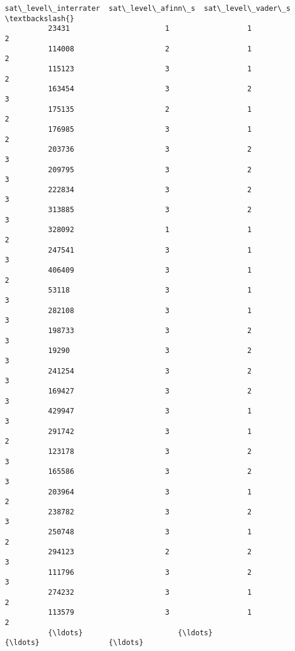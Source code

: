 \documentclass[11pt]{article}
\begin{document}
\begin{Verbatim}[commandchars=\\\{\}]
                  sat\_level\_interrater  sat\_level\_afinn\_s  sat\_level\_vader\_s  \textbackslash{}
          23431                      1                  1                  2   
          114008                     2                  1                  2   
          115123                     3                  1                  2   
          163454                     3                  2                  3   
          175135                     2                  1                  2   
          176985                     3                  1                  2   
          203736                     3                  2                  3   
          209795                     3                  2                  3   
          222834                     3                  2                  3   
          313885                     3                  2                  3   
          328092                     1                  1                  2   
          247541                     3                  1                  3   
          406409                     3                  1                  2   
          53118                      3                  1                  3   
          282108                     3                  1                  3   
          198733                     3                  2                  3   
          19290                      3                  2                  3   
          241254                     3                  2                  3   
          169427                     3                  2                  3   
          429947                     3                  1                  3   
          291742                     3                  1                  2   
          123178                     3                  2                  3   
          165586                     3                  2                  3   
          203964                     3                  1                  2   
          238782                     3                  2                  3   
          250748                     3                  1                  2   
          294123                     2                  2                  3   
          111796                     3                  2                  3   
          274232                     3                  1                  2   
          113579                     3                  1                  2   
          {\ldots}                      {\ldots}                {\ldots}                {\ldots}   

\end{Verbatim}
\end{document}
